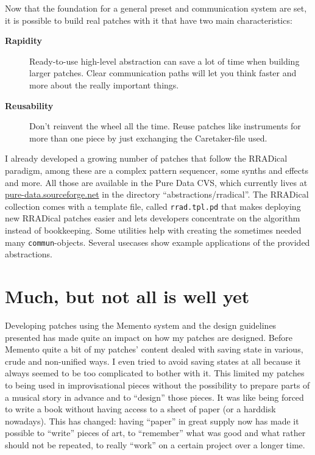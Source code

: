 \documentclass[10pt,english]{scrartcl}
\begin{document}
Now that the foundation for a general preset and communication system are
set, it is possible to build real patches with it that have two main
characteristics:
\begin{description}
\item[\textbf{Rapidity}]

Ready-to-use high-level abstraction can save a lot of time when building
larger patches. Clear communication paths will let you think faster and
more about the really important things.

\item[\textbf{Reusability}]

Don't reinvent the wheel all the time. Reuse patches like instruments
for more than one piece by just exchanging the Caretaker-file used.

\end{description}

I already developed a growing number of patches that follow the RRADical
paradigm, among these are a complex pattern sequencer, some synths and
effects and more. All those are available in the Pure Data CVS, which
currently lives at \href{http://pure-data.sourceforge.net}{pure-data.sourceforge.net} in the directory
``abstractions/rradical''.
The RRADical collection comes with a template file, called
\texttt{rrad.tpl.pd} that makes deploying new RRADical patches easier and lets
developers concentrate on the algorithm instead of bookkeeping. Some
utilities help with creating the sometimes needed many \texttt{commun}-objects.
Several usecases show example applications of the provided abstractions.



\hypertarget{much-but-not-all-is-well-yet}{}
\section*{Much, but not all is well yet}

Developing patches using the Memento system and the design guidelines
presented has made quite an impact on how my patches are designed. Before
Memento quite a bit of my patches' content dealed with saving state in
various, crude and non-unified ways. I even tried to avoid saving states at
all because it always seemed to be too complicated to bother with it. This
limited my patches to being used in improvisational pieces without the
possibility to prepare parts of a musical story in advance and to ``design''
those pieces. It was like being forced to write a book without having access
to a sheet of paper (or a harddisk nowadays). This has changed: having
``paper'' in great supply now has made it possible to ``write'' pieces of art,
to ``remember'' what was good and what rather should not be repeated, to
really ``work'' on a certain project over a longer time.
\end{document}
